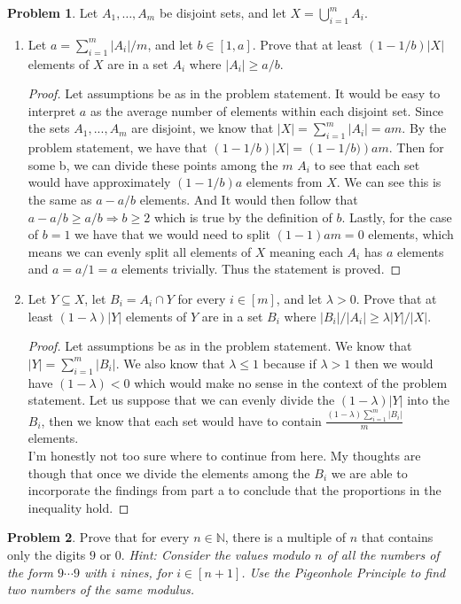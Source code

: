 \documentclass[11pt, letter]{amsart}
\theoremstyle{definition}
\newtheorem{problem}{Problem}[]
\begin{document}
\clearpage
\begin{problem}Let $A_1, \dots, A_m$ be disjoint sets, and let $X = \bigcup_{i=1}^m A_i$.
  \begin{enumerate}[label=(\alph*)]
  \item Let $a = \sum_{i=1}^m |A_i| / m$, and let $b \in [1, a]$.  Prove that at least $(1 - 1/b)|X|$ elements of $X$ are in a set $A_i$ where $|A_i| \geq a / b$.

    \begin{proof}
        Let assumptions be as in the problem statement. It would be easy to interpret $a$ as the average number of elements within each disjoint set. Since the sets $A_1, ..., A_m$ are disjoint, we know that $|X| = \sum_{i = 1}^m|A_i| = am.$ By the problem statement, we have that $\left(1-1/b\right)\left|X\right| = \left(1-1/b)\right)am.$ Then for some b, we can divide these points among the $m$ $A_i$ to see that each set would have approximately $\left(1-1/b\right)a$ elements from $X$. We can see this is the same as $a-a/b$ elements. And It would then follow that $a - a/b \geq a/b \Rightarrow b \geq 2$ which is true by the definition of $b$. Lastly, for the case of $b = 1$ we have that we would need to split $(1-1)am = 0$ elements, which means we can evenly split all elements of $X$ meaning each $A_i$ has $a$ elements and $a = a /1 = a$ elements trivially. Thus the statement is proved.
    \end{proof}
  
  \item Let $Y \subseteq X$, let $B_i = A_i \cap Y$ for every $i \in [m]$, and let $\lambda > 0$.  Prove that at least $(1 - \lambda)|Y|$ elements of $Y$ are in a set $B_i$ where $|B_i| / |A_i| \geq \lambda |Y| / |X|$.

    \begin{proof}
        Let assumptions be as in the problem statement. We know that $\left|Y\right| = \sum_{i = 1}^m \left|B_i\right|$. We also know that $\lambda \leq 1$ because if $\lambda > 1$ then we would have $(1-\lambda) < 0$ which would make no sense in the context of the problem statement. Let us suppose that we can evenly divide the $(1 - \lambda)\left|Y\right|$ into the $B_i$, then we know that each set would have to contain $\frac{(1 - \lambda) \sum_{i = 1}^m\left|B_i\right|}{m}$ elements.\\
        I'm honestly not too sure where to continue from here. My thoughts are though that once we divide the elements among the $B_i$ we are able to incorporate the findings from part a to conclude that the proportions in the inequality hold.
    \end{proof}
  
  \end{enumerate}
\end{problem}
\clearpage
\begin{problem}
  Prove that for every $n \in \mathbb N$, there is a multiple of $n$ that contains only the digits $9$ or $0$.  \textit{Hint: Consider the values modulo $n$ of all the numbers of the form $9\cdots 9$ with $i$ nines, for $i \in [n + 1]$.  Use the Pigeonhole Principle to find two numbers of the same modulus.}
\end{problem}
\end{document}
